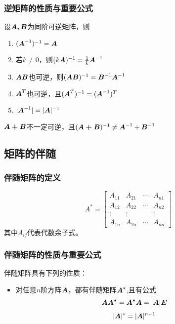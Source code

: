 \documentclass[12pt, a4paper, oneside, UTF8]{ctexbook}
\begin{document}
\subsubsection{逆矩阵的性质与重要公式}
设$\boldsymbol{A, B}$为同阶可逆矩阵，则
\begin{enumerate}[leftmargin=4em]
    \item $(\boldsymbol{A}^{-1})^{-1}=\boldsymbol{A}$
    \item 若$k\neq0$，则$(k\boldsymbol{A})^{-1}=\frac{1}{k} \boldsymbol{A}^{-1}$
    \item $\boldsymbol{AB}$也可逆，则$(\boldsymbol{AB})^{-1}=\boldsymbol{B}^{-1}\boldsymbol{A}^{-1}$
    \item $\boldsymbol{A}^T$也可逆，且$(\boldsymbol{A}^T)^{-1}=(\boldsymbol{A}^{-1})^{T}$
    \item $|\boldsymbol{A}^{-1}|=|\boldsymbol{A}|^{-1}$
\end{enumerate}
\begin{rmk}
    $\boldsymbol{A+B}$不一定可逆，且$(\boldsymbol{A+B})^{-1}\neq\boldsymbol{A}^{-1}+\boldsymbol{B}^{-1}$
\end{rmk}
\subsection{矩阵的伴随}
\subsubsection{伴随矩阵的定义}
\begin{defn}{}{}
    \[
        A^*=\begin{bmatrix}
            A_{11} & A_{21} & \cdots & A_{n1}\\
            A_{12} & A_{22} &  \cdots & A_{n2}\\
            \vdots & \vdots &  & \vdots\\
            A_{1n} & A_{2n} & \cdots & A_{nn}
        \end{bmatrix}
    \]
    其中$A_{ij}$代表代数余子式。
\end{defn}
\subsubsection{伴随矩阵的性质与重要公式}
伴随矩阵具有下列的性质：
\begin{itemize}[leftmargin=4em]
    \item 对任意$n$阶方阵$\boldsymbol{A}$，都有伴随矩阵$\boldsymbol{A}^*$,且有公式\[\boldsymbol{AA^*}=\boldsymbol{A^*A}=|\boldsymbol{A}|\boldsymbol{E}\]\[|\boldsymbol{A}|^*=|\boldsymbol{A}|^{n-1}\]
\end{itemize}
\end{document}
